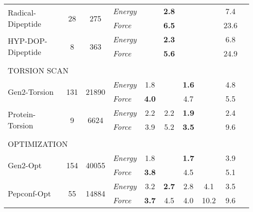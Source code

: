 \documentclass[varwidth]{standalone}
\newcommand{\widthbetweentype}{7pt}
\begin{document}
\begin{adjustbox}{width=\textwidth,center}
\begin{tabular}{l c c l c c c c c c}
\hline
\multirow{2}{*}{Radical-Dipeptide} & \multirow{2}{*}{28} & \multirow{2}{*}{275} & \textit{Energy} &  & \textbf{2.8} &  &  & 7.4\\
                                   &                       &                         & \textit{Force}  &  & \textbf{6.5} &  &  & 23.6\\
\hline
\multirow{2}{*}{HYP-DOP-Dipeptide} & \multirow{2}{*}{8} & \multirow{2}{*}{363} & \textit{Energy} &  & \textbf{2.3} &  &  & 6.8\\
                                   &                       &                         & \textit{Force}  &  & \textbf{5.6} &  &  & 24.9\\
\hline
\multicolumn{8}{l}{\vspace{\widthbetweentype}} \\[-1em]
\multicolumn{8}{l}{\small{TORSION SCAN}} \\\hline
\multirow{2}{*}{Gen2-Torsion} & \multirow{2}{*}{131} & \multirow{2}{*}{21890} & \textit{Energy} & 1.8 &  & \textbf{1.6} &  & 4.8\\
                                   &                       &                         & \textit{Force}  & \textbf{4.0} &  & 4.7 &  & 5.5\\
\hline
\multirow{2}{*}{Protein-Torsion} & \multirow{2}{*}{9} & \multirow{2}{*}{6624} & \textit{Energy} & 2.2 & 2.2 & \textbf{1.9} &  & 2.4\\
                                   &                       &                         & \textit{Force}  & 3.9 & 5.2 & \textbf{3.5} &  & 9.6\\
\hline
\multicolumn{8}{l}{\vspace{\widthbetweentype}} \\[-1em]
\multicolumn{8}{l}{\small{OPTIMIZATION}} \\\hline
\multirow{2}{*}{Gen2-Opt} & \multirow{2}{*}{154} & \multirow{2}{*}{40055} & \textit{Energy} & 1.8 &  & \textbf{1.7} &  & 3.9\\
                                   &                       &                         & \textit{Force}  & \textbf{3.8} &  & 4.5 &  & 5.1\\
\hline
\multirow{2}{*}{Pepconf-Opt} & \multirow{2}{*}{55} & \multirow{2}{*}{14884} & \textit{Energy} & 3.2 & \textbf{2.7} & 2.8 & 4.1 & 3.5\\
                                   &                       &                         & \textit{Force}  & \textbf{3.7} & 4.5 & 4.0 & 10.2 & 9.6\\
\hline
\hline
\hline
\end{tabular}

\end{adjustbox}
\end{document}
